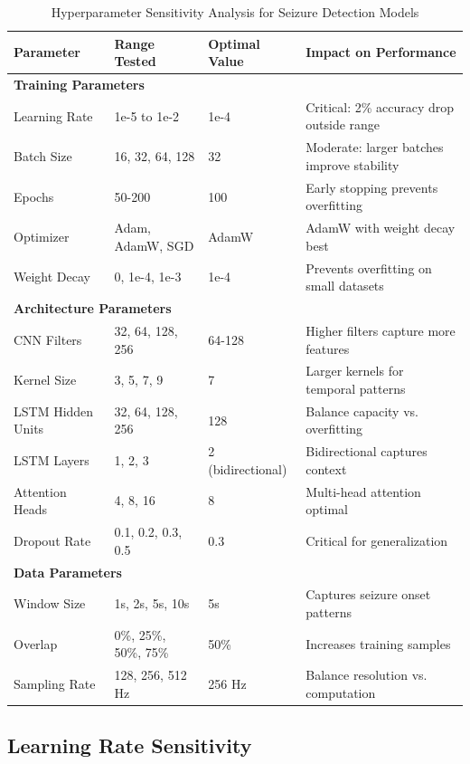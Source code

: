 \documentclass[12pt,a4paper]{article}
\begin{document}
\begin{table}[H]
\centering
\caption{Hyperparameter Sensitivity Analysis for Seizure Detection Models}
\label{tab:hyperparams}
\begin{tabular}{llp{3cm}p{4cm}}
\toprule
\textbf{Parameter} & \textbf{Range Tested} & \textbf{Optimal Value} & \textbf{Impact on Performance} \\
\midrule
\multicolumn{4}{l}{\textbf{Training Parameters}} \\
\midrule
Learning Rate & 1e-5 to 1e-2 & 1e-4 & Critical: 2\% accuracy drop outside range \\
Batch Size & 16, 32, 64, 128 & 32 & Moderate: larger batches improve stability \\
Epochs & 50-200 & 100 & Early stopping prevents overfitting \\
Optimizer & Adam, AdamW, SGD & AdamW & AdamW with weight decay best \\
Weight Decay & 0, 1e-4, 1e-3 & 1e-4 & Prevents overfitting on small datasets \\
\midrule
\multicolumn{4}{l}{\textbf{Architecture Parameters}} \\
\midrule
CNN Filters & 32, 64, 128, 256 & 64-128 & Higher filters capture more features \\
Kernel Size & 3, 5, 7, 9 & 7 & Larger kernels for temporal patterns \\
LSTM Hidden Units & 32, 64, 128, 256 & 128 & Balance capacity vs. overfitting \\
LSTM Layers & 1, 2, 3 & 2 (bidirectional) & Bidirectional captures context \\
Attention Heads & 4, 8, 16 & 8 & Multi-head attention optimal \\
Dropout Rate & 0.1, 0.2, 0.3, 0.5 & 0.3 & Critical for generalization \\
\midrule
\multicolumn{4}{l}{\textbf{Data Parameters}} \\
\midrule
Window Size & 1s, 2s, 5s, 10s & 5s & Captures seizure onset patterns \\
Overlap & 0\%, 25\%, 50\%, 75\% & 50\% & Increases training samples \\
Sampling Rate & 128, 256, 512 Hz & 256 Hz & Balance resolution vs. computation \\
\bottomrule
\end{tabular}
\end{table}

\subsection{Learning Rate Sensitivity}
\end{document}

